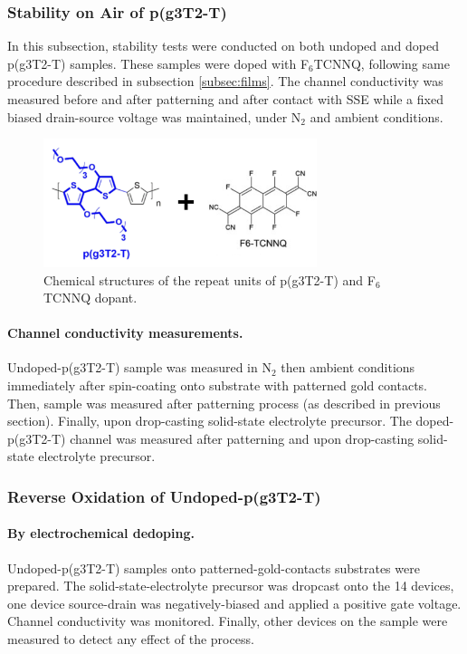 \subsubsection{Stability on Air of p(g3T2-T)}
In this subsection, stability tests were conducted on both undoped and doped p(g3T2-T) samples. These samples were doped with F$_{6}$TCNNQ, following same procedure described in subsection \ref{subsec:films}. The channel conductivity was measured %
before and after patterning and after contact with SSE %
while a fixed biased drain-source voltage was maintained, under N$_{2}$ and ambient conditions. %

\begin{figure}[ht]
  \centering
  \includegraphics[width=8cm]{Images/pdf/doping_formulas2.pdf}
  \caption{Chemical structures of the repeat units of p(g3T2-T) and F$_{6}$TCNNQ dopant.}
  \label{fig:dop2}
\end{figure}

\paragraph{Channel conductivity measurements.}Undoped-p(g3T2-T) sample was measured in N$_{2}$ then ambient conditions immediately after spin-coating onto substrate with patterned gold contacts. Then, sample was measured after patterning process (as described in previous section). Finally, upon drop-casting solid-state electrolyte precursor. The doped-p(g3T2-T) channel was measured after patterning and upon drop-casting solid-state electrolyte precursor.

\subsubsection{Reverse Oxidation of Undoped-p(g3T2-T)}

\paragraph{By electrochemical dedoping.}Undoped-p(g3T2-T) samples onto patterned-gold-contacts substrates were prepared. The solid-state-electrolyte precursor was dropcast onto the 14 devices, one device source-drain was negatively-biased and applied a positive gate voltage. Channel conductivity was monitored. Finally, other devices on the sample were measured to detect any effect of the process.

